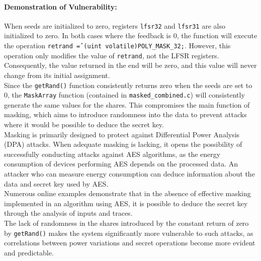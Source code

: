 \documentclass[12pt]{article}
\begin{document}
    \paragraph{Demonstration of Vulnerability:}
    When seeds are initialized to zero, registers \texttt{lfsr32} and \texttt{lfsr31} are also initialized to zero. In both cases where the feedback is 0, the function will execute the operation \texttt{retrand \^= (uint volatile)POLY\_MASK\_32;}. However, this operation only modifies the value of \texttt{retrand}, not the LFSR registers. Consequently, the value returned in the end will be zero, and this value will never change from its initial assignment.
    \\
    Since the \texttt{getRand()} function consistently returns zero when the seeds are set to 0, the \texttt{MaskArray} function (contained in \texttt{masked\_combined.c}) will consistently generate the same values for the shares. This compromises the main function of masking, which aims to introduce randomness into the data to prevent attacks where it would be possible to deduce the secret key.
    \\
    Masking is primarily designed to protect against Differential Power Analysis (DPA) attacks. When adequate masking is lacking, it opens the possibility of successfully conducting attacks against AES algorithms, as the energy consumption of devices performing AES depends on the processed data. An attacker who can measure energy consumption can deduce information about the data and secret key used by AES.
    \\
    Numerous online examples demonstrate that in the absence of effective masking implemented in an algorithm using AES, it is possible to deduce the secret key through the analysis of inputs and traces.
    \\
    The lack of randomness in the shares introduced by the constant return of zero by \texttt{getRand()} makes the system significantly more vulnerable to such attacks, as correlations between power variations and secret operations become more evident and predictable.
\end{document}
